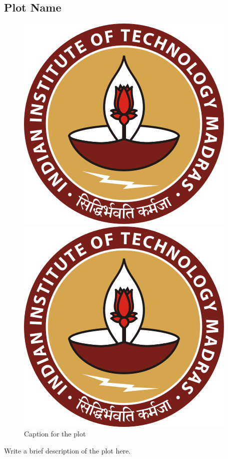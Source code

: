 \documentclass[12pt]{article}
\begin{document}
\subsection{Plot Name}
\begin{figure}[H]
    \centering
    \begin{minipage}{0.45\textwidth}
        \centering
        \includegraphics[width=\textwidth]{logos and images/IIT_Madras_Logo.svg.png}
    \end{minipage}
    \hfill
    \begin{minipage}{0.45\textwidth}
        \centering
        \includegraphics[width=\textwidth]{logos and images/IIT_Madras_Logo.svg.png}
    \end{minipage}
    \caption{Caption for the plot}
\end{figure}
 Write a brief description of the plot here.
\end{document}
